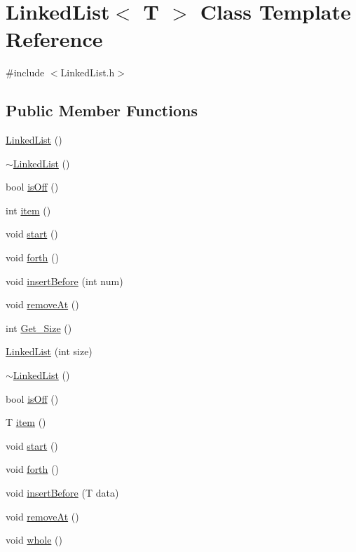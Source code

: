 \hypertarget{class_linked_list}{\section{Linked\-List$<$ T $>$ Class Template Reference}
\label{class_linked_list}
}


{\ttfamily \#include $<$Linked\-List.\-h$>$}

\subsection*{Public Member Functions}
\begin{DoxyCompactItemize}
\item 
\hyperlink{class_linked_list_a3c20fcfec867e867f541061a09fc640c}{Linked\-List} ()
\item 
\hyperlink{class_linked_list_a7c37609df3b83bc4eb0281b852f93fd7}{$\sim$\-Linked\-List} ()
\item 
bool \hyperlink{class_linked_list_a66623a06d807357884006e8724c82297}{is\-Off} ()
\item 
int \hyperlink{class_linked_list_a5d442d070c04f5a223ba3963a092b916}{item} ()
\item 
void \hyperlink{class_linked_list_a46632fdbf5a64821dbe642070416b7c6}{start} ()
\item 
void \hyperlink{class_linked_list_a5c00242d2105ab8057af3efa68c18af4}{forth} ()
\item 
void \hyperlink{class_linked_list_a467c23980e0c463c12a3a820743b180b}{insert\-Before} (int num)
\item 
void \hyperlink{class_linked_list_ae28327cccd9acd61c33a6b51631ffdee}{remove\-At} ()
\item 
int \hyperlink{class_linked_list_a7eba1203d539345805a669f2ca23cf66}{Get\-\_\-\-Size} ()
\item 
\hyperlink{class_linked_list_a7bf2d4b9ac8f9bb493e4e1237adb981a}{Linked\-List} (int size)
\item 
\hyperlink{class_linked_list_a7c37609df3b83bc4eb0281b852f93fd7}{$\sim$\-Linked\-List} ()
\item 
bool \hyperlink{class_linked_list_a66623a06d807357884006e8724c82297}{is\-Off} ()
\item 
T \hyperlink{class_linked_list_a5d442d070c04f5a223ba3963a092b916}{item} ()
\item 
void \hyperlink{class_linked_list_a46632fdbf5a64821dbe642070416b7c6}{start} ()
\item 
void \hyperlink{class_linked_list_a5c00242d2105ab8057af3efa68c18af4}{forth} ()
\item 
void \hyperlink{class_linked_list_ad88b2169453b763c78ba739551857db4}{insert\-Before} (T data)
\item 
void \hyperlink{class_linked_list_ae28327cccd9acd61c33a6b51631ffdee}{remove\-At} ()
\item 
void \hyperlink{class_linked_list_a3a83eb87f262980e4681e4c94ee05136}{whole} ()
\end{DoxyCompactItemize}
